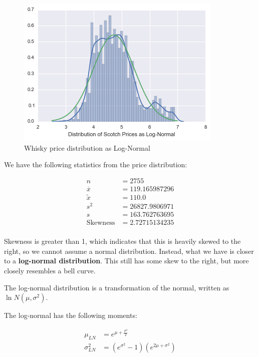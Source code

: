 \pagebreak

\begin{figure}[htb]
\centering
\includegraphics[scale=1]{price_distribution_log_normal}
\caption{Whisky price distribution as Log-Normal}
\label{fig:price_distribution_log_normal} 
\end{figure}

\pagebreak

We have the following statistics from the price distribution:

\begin{equation*}
\begin{split}
    n &= 2755 \\
    \overline{x} &=  119.165987296 \\
    \widetilde{x} &= 110.0 \\
    s^2 &= 26827.9806971 \\
    s &= 163.762763695 \\
    \text{Skewness} &= 2.72715134235 \\
\end{split}
\end{equation*}

Skewness is greater than 1, which indicates that this is heavily skewed to the right, so we cannot assume a normal distribution. Instead, what we have is closer to a \textbf{log-normal distribution}. This still has some skew to the right, but more closely resembles a bell curve. 


\pagebreak

The log-normal distribution is a transformation of the normal, written as $\ln{N(\mu, \sigma^2)}$. 

The log-normal has the following moments:

\begin{equation*}
\begin{split}
    \mu_{LN} &= e^{\mu + \frac{\sigma^2}{2}} \\
    \sigma_{LN}^2 &= (e^{\sigma^2} - 1)(e^{2\mu + \sigma^2}) \\
\end{split}
\end{equation*}

